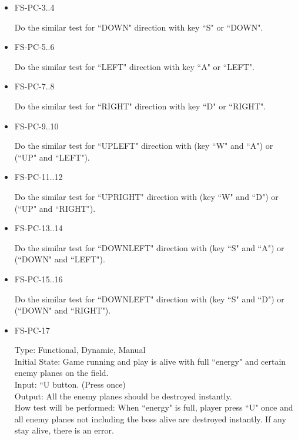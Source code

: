 \documentclass[12pt, titlepage]{article}
\begin{document}
\begin{itemize}
\item{FS-PC-{\color{red}3..4}}

Do the similar test for ``DOWN" direction with key ``S" or ``DOWN".

\item{FS-PC-{\color{red}5..6}}

Do the similar test for ``LEFT" direction with key ``A" or ``LEFT".

\item{FS-PC-{\color{red}7..8}\\}

Do the similar test for ``RIGHT" direction with key ``D" or ``RIGHT".

\item{FS-PC-{\color{red}9..10\\}}

Do the similar test for ``UPLEFT" direction with (key ``W" and ``A") or (``UP" and ``LEFT").

\item{FS-PC-{\color{red}11..12\\}}

Do the similar test for ``UPRIGHT" direction with (key ``W" and ``D") or (``UP" and ``RIGHT").

\item{FS-PC-{\color{red}13..14\\}}

Do the similar test for ``DOWNLEFT" direction with (key ``S" and ``A") or (``DOWN" and ``LEFT").

\item{FS-PC-{\color{red}15..16\\}}

Do the similar test for ``DOWNLEFT" direction with (key ``S" and ``D") or (``DOWN" and ``RIGHT").

\item{FS-PC-{\color{red}17}\\}

Type: Functional, Dynamic, Manual\\
Initial State: Game running and play is alive with full ``energy" and certain enemy planes on the field.\\
Input: ``U button. (Press once)\\
Output: All the enemy planes should be destroyed instantly.\\
How test will be performed: When ``energy" is full, player press ``U" once and all enemy planes {\color{red} not including the boss} alive are destroyed instantly. If any stay alive, there is an error.\\
\end{itemize}
\end{document}
